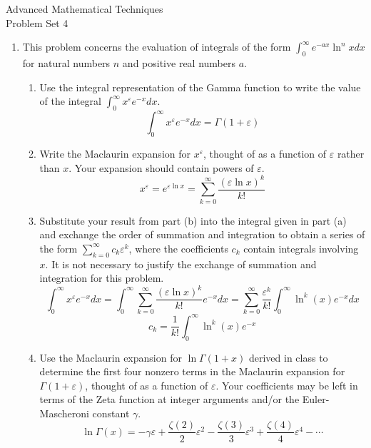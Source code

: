 \documentclass{article}
\begin{document}
\thispagestyle{fancy}
\begin{center}\LARGE{Advanced Mathematical Techniques \\ Problem Set 4}\end{center}
\vspace{10mm}

\begin{enumerate}
    \item This problem concerns the evaluation of integrals of the form $\int_{0}^{\infty} e^{-ax}\ln^nxdx$ for natural numbers $n$ and positive real numbers $a$.
    \begin{enumerate}
        \item Use the integral representation of the Gamma function to write the value of the integral $\int_{0}^{\infty} x^{\varepsilon}e^{-x}dx$.
        \\
        \[\int_{0}^{\infty} x^{\varepsilon}e^{-x}dx = \boxed{\Gamma(1+\varepsilon)}\]
        \item Write the Maclaurin expansion for $x^{\varepsilon}$, thought of as a function of $\varepsilon$ rather than $x$. Your expansion should contain powers of $\varepsilon$.
        \\
        \[x^{\varepsilon} = e^{\varepsilon\ln x} = \boxed{\sum_{k=0}^{\infty}\frac{(\varepsilon\ln x)^k}{k!}}\]
        \item Substitute your result from part (b) into the integral given in part (a) and exchange the order of summation and integration to obtain a series of the form $\sum_{k=0}^{\infty}c_k\varepsilon^k$, where the coefficients $c_k$ contain integrals involving $x$. It is not necessary to justify the exchange of summation and integration for this problem.
        \\
        \[\int_{0}^{\infty} x^{\varepsilon}e^{-x}dx = \int_{0}^{\infty}\sum_{k=0}^{\infty}\frac{(\varepsilon\ln x)^k}{k!} e^{-x}dx = \sum_{k=0}^{\infty} \frac{\varepsilon^k}{k!} \int_{0}^{\infty} \ln^k(x) e^{-x}dx\]
        \[c_k = \boxed{\frac{1}{k!}\int_{0}^{\infty} \ln^k(x) e^{-x}}\]
        \item Use the Maclaurin expansion for $\ln\Gamma(1+x)$ derived in class to determine the first four nonzero terms in the Maclaurin expansion for $\Gamma(1+\varepsilon)$, thought of as a function of $\varepsilon$. Your coefficients may be left in terms of the Zeta function at integer arguments and/or the Euler-Mascheroni constant $\gamma$.
        \\
        \[\ln \Gamma(x) = -\gamma \varepsilon + \frac{\zeta(2)}{2}\varepsilon^2 - \frac{\zeta(3)}{3}\varepsilon^3 + \frac{\zeta(4)}{4}\varepsilon^4 - \cdots\]

\end{enumerate}
\end{enumerate}
\end{document}
